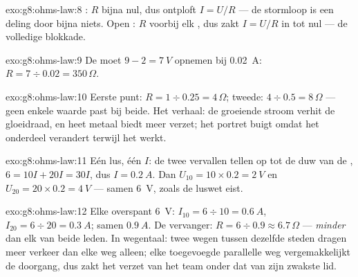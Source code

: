 \begin{solution}{exo:g8:ohms-law:8}
: $R$ bijna nul, dus ontploft $I = U/R$ --- de
stormloop is een deling door bijna niets. Open
: $R$ voorbij elk , dus zakt $I = U/R$
in tot nul --- de volledige blokkade.
\end{solution}

\begin{solution}{exo:g8:ohms-law:9}
De  moet $9 - 2 = \qty{7}{V}$ opnemen bij
\qty{0.02}{A}: $R = 7 \div 0.02 = 350\,\Omega$.
\end{solution}

\begin{solution}{exo:g8:ohms-law:10}
Eerste punt: $R = 1 \div 0.25 = 4\,\Omega$; tweede: $4 \div 0.5 =
8\,\Omega$ --- geen enkele waarde past bij beide. Het verhaal: de
groeiende stroom verhit de gloeidraad, en heet metaal biedt
meer verzet; het portret buigt omdat het onderdeel verandert terwijl
het werkt.
\end{solution}

\begin{solution}{exo:g8:ohms-law:11}
Eén lus, één $I$: de twee vervallen tellen op tot de duw van de
, $6 = 10 I + 20 I = 30 I$, dus $I = \qty{0.2}{A}$. Dan
$U_{10} = 10 \times 0.2 = \qty{2}{V}$ en $U_{20} = 20 \times 0.2 =
\qty{4}{V}$ --- samen \qty{6}{V}, zoals de luswet eist.
\end{solution}

\begin{solution}{exo:g8:ohms-law:12}
Elke  overspant \qty{6}{V}: $I_{10} = 6 \div 10 =
\qty{0.6}{A}$, $I_{20} = 6 \div 20 = \qty{0.3}{A}$; samen
$\qty{0.9}{A}$. De vervanger: $R = 6 \div 0.9 \approx 6.7\,\Omega$ ---
\emph{minder} dan elk van beide leden. In wegentaal: twee wegen tussen
dezelfde steden dragen meer verkeer dan elke weg alleen; elke
toegevoegde parallelle weg vergemakkelijkt de doorgang, dus zakt het
verzet van het team onder dat van zijn zwakste lid.
\end{solution}

